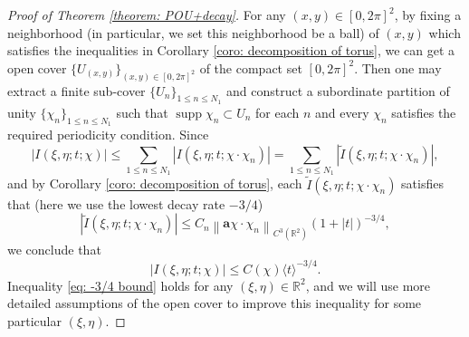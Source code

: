 \documentclass[12pt]{amsart}
\newcommand\JP[1]{\langle#1\rangle}
\newcommand\norm[1]{\left\|#1\right\|}
\newcommand{\R}{\mathbb{R}}
\begin{document}
\begin{proof}[Proof of Theorem \ref{theorem: POU+decay}]
    For any $\left(x,y\right)\in\left[0,2\pi\right]^{2}$, by fixing a neighborhood (in particular, we set this neighborhood be a ball) of $\left(x,y\right)$ which satisfies the inequalities in Corollary \ref{coro: decomposition of torus}, we can get a open cover $\{U_{\left(x,y\right)}\}_{\left(x,y\right)\in\left[0,2\pi\right]^{2}}$ of the compact set $\left[0,2\pi\right]^{2}$. Then one may extract a finite sub-cover $\{U_n\}_{1\le n\le N_1}$ and construct a subordinate partition of unity $\{\chi_n\}_{1\le n\le N_1}$ such that $\operatorname{supp}\chi_n\subset U_n$ for each $n$ and every $\chi_n$ satisfies the required periodicity condition. Since
    \begin{equation}
        \left|I\left(\xi,\eta;t;\chi\right)\right|\leq\sum_{1\leq n\leq N_{1}}\left|I\left(\xi,\eta;t;\chi\cdot\chi_{n}\right)\right|=\sum_{1\leq n\leq N_{1}}\left|\widetilde{I}\left(\xi,\eta;t;\chi\cdot\chi_{n}\right)\right|,
    \end{equation}
    and by Corollary \ref{coro: decomposition of torus}, each $\widetilde{I}\left(\xi,\eta;t;\chi\cdot\chi_{n}\right)$ satisfies that (here we use the lowest decay rate $-3/4$)
    \begin{equation*}
        \left|\widetilde{I}\left(\xi,\eta;t;\chi\cdot\chi_{n}\right)\right|\leq C_{n}\norm{\mathbf{a}\chi\cdot\chi_{n}}_{C^{3}\left(\R^{2}\right)}\left(1+\left|t\right|\right)^{-3/4},
    \end{equation*}
    we conclude that
    \begin{equation}\label{eq: -3/4 bound}
        \left|I\left(\xi,\eta;t;\chi\right)\right|\leq C\left(\chi\right)\JP{t}^{-3/4}.
    \end{equation}
    Inequality \eqref{eq: -3/4 bound} holds for any $\left(\xi,\eta\right)\in\R^{2}$, and we will use more detailed assumptions of the open cover to improve this inequality for some particular $\left(\xi,\eta\right)$. 
    

\end{proof}
\end{document}
